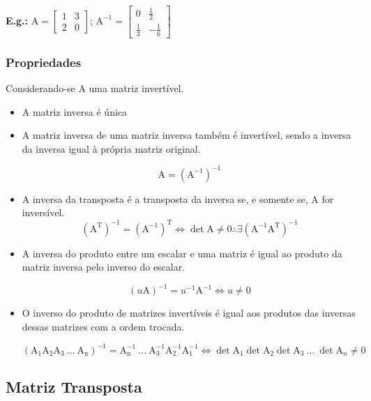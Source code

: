 \documentclass[a4paper,12pt]{article}
\begin{document}
\textbf{E.g.:} $ \text{A} = \begin{bmatrix}
1 & 3 \\
2 & 0
\end{bmatrix} $; $ \text{A}^{-1} = \begin{bmatrix}
0 & \frac{1}{2}\\
\frac{1}{3} & - \frac{1}{6}
\end{bmatrix} $

\subsubsection{Propriedades}

Considerando-se $ \text{A} $ uma matriz invertível.

\begin{itemize}
    \item A matriz inversa é única
    
    \item A matriz inversa de uma matriz inversa também é invertível, sendo a inversa da inversa igual à própria matriz original.
    
    $$ \text{A} = (\text{A}^{-1})^{-1} $$
    
   \item A inversa da transposta é a transposta da inversa se, e somente se, $\text{A}$ for inversível. $$(\text{A}^\text{T})^{-1} = (\text{A}^{-1})^\text{T} \Leftrightarrow \det \text{A} \neq 0 \therefore \exists (\text{A}^{-1}\text{A}^{\text{T}})^{-1} $$
   
   \item A inversa do produto entre um escalar e uma matriz é igual ao produto da matriz inversa pelo inverso do escalar.
   
   $$ (u \text{A})^{-1}=u^{-1} \text{A}^{-1} \Leftrightarrow u \neq 0 $$
   
   \item O inverso do produto de matrizes invertíveis é igual aos produtos das inversas dessas matrizes com a ordem trocada.
   
   $$ (\text{A}_{1}\text{A}_{2}\text{A}_{3} \ ... \ \text{A}_{\text{n}})^{-1} = \text{A}_{\text{n}}^{-1} \ ... \ \text{A}_{3}^{-1}\text{A}_{2}^{-1}\text{A}_{1}^{-1} \Leftrightarrow \det \text{A}_{1} \det \text{A}_{2} \det \text{A}_{3} \ ... \ \det \text{A}_{n} \neq 0$$
   
\end{itemize}

\subsection{Matriz Transposta}
\end{document}
